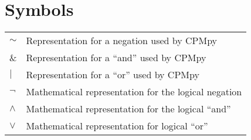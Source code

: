 \documentclass[master=cws, masteroption=se, english, oneside]{kulemt} %
\begin{document}
\section*{Symbols}
\begin{flushleft}
	\renewcommand{\arraystretch}{1.1}
	\begin{tabularx}{\textwidth}{@{}p{14mm}X@{}}
		$\sim$ & Representation for a negation used by CPMpy\\
		$\&$ & Representation for a “and” used by CPMpy\\
		$\vert$ & Representation for a “or” used by CPMpy\\
		$\neg$ & Mathematical representation for the logical negation \\
		$\land$ & Mathematical representation for the logical “and” \\
		$\lor$  & Mathematical representation for logical “or” \\
	\end{tabularx}
\end{flushleft}

\mainmatter



%

\backmatter
%
%
\nocite{MasterproefRubenKindt}
\printbibliography
\end{document}
